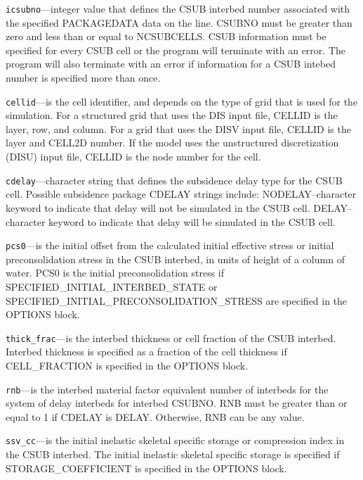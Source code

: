 \begin{description}
\item \texttt{icsubno}---integer value that defines the CSUB interbed number associated with the specified PACKAGEDATA data on the line. CSUBNO must be greater than zero and less than or equal to NCSUBCELLS.  CSUB information must be specified for every CSUB cell or the program will terminate with an error.  The program will also terminate with an error if information for a CSUB intebed number is specified more than once.

\item \texttt{cellid}---is the cell identifier, and depends on the type of grid that is used for the simulation.  For a structured grid that uses the DIS input file, CELLID is the layer, row, and column.   For a grid that uses the DISV input file, CELLID is the layer and CELL2D number.  If the model uses the unstructured discretization (DISU) input file, CELLID is the node number for the cell.

\item \texttt{cdelay}---character string that defines the subsidence delay type for the CSUB cell. Possible subsidence package CDELAY strings include: NODELAY--character keyword to indicate that delay will not be simulated in the CSUB cell.  DELAY--character keyword to indicate that delay will be simulated in the CSUB cell.

\item \texttt{pcs0}---is the initial offset from the calculated initial effective stress or initial preconsolidation stress in the CSUB interbed, in units of height of a column of water. PCS0 is the initial preconsolidation stress if SPECIFIED\_INITIAL\_INTERBED\_STATE or SPECIFIED\_INITIAL\_PRECONSOLIDATION\_STRESS are specified in the OPTIONS block.

\item \texttt{thick\_frac}---is the interbed thickness or cell fraction of the CSUB interbed. Interbed thickness is specified as a fraction of the cell thickness if CELL\_FRACTION is specified in the OPTIONS block.

\item \texttt{rnb}---is the interbed material factor equivalent number of interbeds for the system of delay interbeds for interbed CSUBNO. RNB must be greater than or equal to 1 if CDELAY is DELAY. Otherwise, RNB can be any value.

\item \texttt{ssv\_cc}---is the initial inelastic skeletal specific storage or compression index in the CSUB interbed. The initial inelastic skeletal specific storage is specified if STORAGE\_COEFFICIENT is specified in the OPTIONS block.


\end{description}
